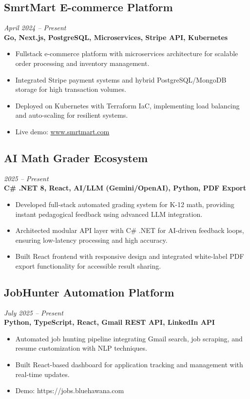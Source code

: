 \documentclass[10pt,a4paper]{article}
\begin{document}
\subsection*{SmrtMart E-commerce Platform}
\textit{April 2024 -- Present} \\
\textbf{Go, Next.js, PostgreSQL, Microservices, Stripe API, Kubernetes}
\begin{itemize}[noitemsep]
\item Fullstack e-commerce platform with microservices architecture for scalable order processing and inventory management.
\item Integrated Stripe payment systems and hybrid PostgreSQL/MongoDB storage for high transaction volumes.
\item Deployed on Kubernetes with Terraform IaC, implementing load balancing and auto-scaling for resilient systems.
\item Live demo: \href{https://www.smrtmart.com}{www.smrtmart.com}
\end{itemize}

\subsection*{AI Math Grader Ecosystem}
\textit{2025 -- Present} \\
\textbf{C\# .NET 8, React, AI/LLM (Gemini/OpenAI), Python, PDF Export}
\begin{itemize}[noitemsep]
\item Developed full-stack automated grading system for K-12 math, providing instant pedagogical feedback using advanced LLM integration.
\item Architected modular API layer with C\# .NET for AI-driven feedback loops, ensuring low-latency processing and high accuracy.
\item Built React frontend with responsive design and integrated white-label PDF export functionality for accessible result sharing.
\end{itemize}

\subsection*{JobHunter Automation Platform}
\textit{July 2025 -- Present} \\
\textbf{Python, TypeScript, React, Gmail REST API, LinkedIn API}
\begin{itemize}[noitemsep]
\item Automated job hunting pipeline integrating Gmail search, job scraping, and resume customization with NLP techniques.
\item Built React-based dashboard for application tracking and management with real-time updates.
\item Demo: https://jobs.bluehawana.com
\end{itemize}
\end{document}
